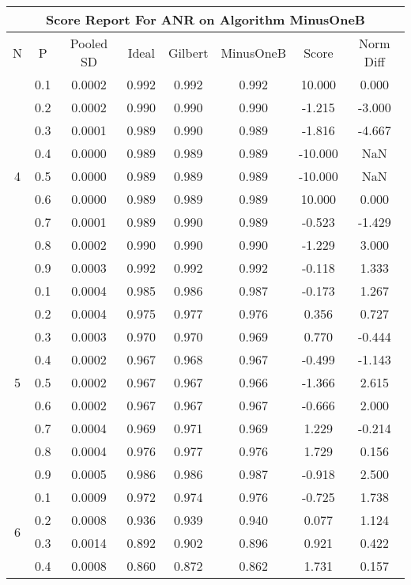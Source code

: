 \documentclass[11pt,a4paper]{report}
\begin{document}
\begin{longtable}{ | c | c || c | c | c | c | c | c | }
\hline
\multicolumn{8}{|c|}{ Score Report For ANR on Algorithm MinusOneB} \\
\hline
N & P & Pooled SD &  Ideal &  Gilbert & MinusOneB  & Score & Norm Diff \\
 \hline
 \hline
 \endhead
\multirow{9}{*}{4} & 0.1 & 0.0002 & 0.992 & 0.992 & 0.992 & 10.000 & 0.000 \\
 & 0.2 & 0.0002 & 0.990 & 0.990 & 0.990 & -1.215 & -3.000 \\
 & 0.3 & 0.0001 & 0.989 & 0.990 & 0.989 & -1.816 & -4.667 \\
 & 0.4 & 0.0000 & 0.989 & 0.989 & 0.989 & -10.000 & NaN \\
 & 0.5 & 0.0000 & 0.989 & 0.989 & 0.989 & -10.000 & NaN \\
 & 0.6 & 0.0000 & 0.989 & 0.989 & 0.989 & 10.000 & 0.000 \\
 & 0.7 & 0.0001 & 0.989 & 0.990 & 0.989 & -0.523 & -1.429 \\
 & 0.8 & 0.0002 & 0.990 & 0.990 & 0.990 & -1.229 & 3.000 \\
 & 0.9 & 0.0003 & 0.992 & 0.992 & 0.992 & -0.118 & 1.333 \\
 \hline
\multirow{9}{*}{5} & 0.1 & 0.0004 & 0.985 & 0.986 & 0.987 & -0.173 & 1.267 \\
 & 0.2 & 0.0004 & 0.975 & 0.977 & 0.976 & 0.356 & 0.727 \\
 & 0.3 & 0.0003 & 0.970 & 0.970 & 0.969 & 0.770 & -0.444 \\
 & 0.4 & 0.0002 & 0.967 & 0.968 & 0.967 & -0.499 & -1.143 \\
 & 0.5 & 0.0002 & 0.967 & 0.967 & 0.966 & -1.366 & 2.615 \\
 & 0.6 & 0.0002 & 0.967 & 0.967 & 0.967 & -0.666 & 2.000 \\
 & 0.7 & 0.0004 & 0.969 & 0.971 & 0.969 & 1.229 & -0.214 \\
 & 0.8 & 0.0004 & 0.976 & 0.977 & 0.976 & 1.729 & 0.156 \\
 & 0.9 & 0.0005 & 0.986 & 0.986 & 0.987 & -0.918 & 2.500 \\
 \hline
\multirow{9}{*}{6} & 0.1 & 0.0009 & 0.972 & 0.974 & 0.976 & -0.725 & 1.738 \\
 & 0.2 & 0.0008 & 0.936 & 0.939 & 0.940 & 0.077 & 1.124 \\
 & 0.3 & 0.0014 & 0.892 & 0.902 & 0.896 & 0.921 & 0.422 \\
 & 0.4 & 0.0008 & 0.860 & 0.872 & 0.862 & 1.731 & 0.157 \\

\end{longtable}
\end{document}
